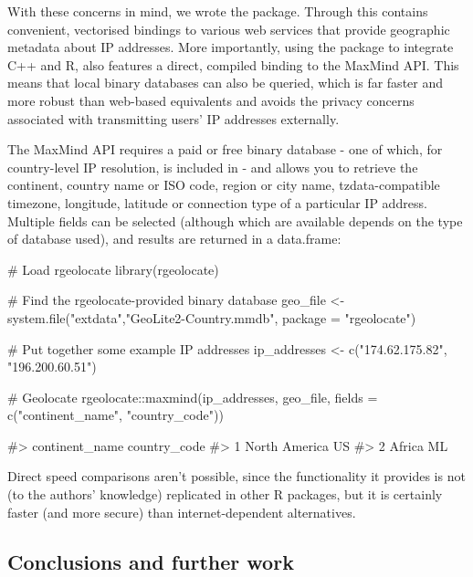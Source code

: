 With these concerns in mind, we wrote the 
\citep{rgeolocate} package. Through  this contains convenient,
vectorised bindings to various web services that provide geographic
metadata about IP addresses. More importantly, using the 
package to integrate C++ and R,  also features a direct,
compiled binding to the MaxMind API. This means that local binary
databases can also be queried, which is far faster and more robust than
web-based equivalents and avoids the privacy concerns associated with
transmitting users' IP addresses externally.

The MaxMind API requires a paid or free binary database - one of which,
for country-level IP resolution, is included in  - and
allows you to retrieve the continent, country name or ISO code, region
or city name, tzdata-compatible timezone, longitude, latitude or
connection type of a particular IP address. Multiple fields can be
selected (although which are available depends on the type of database
used), and results are returned in a data.frame:

\begin{Schunk}
\begin{Sinput}
# Load rgeolocate
library(rgeolocate)

# Find the rgeolocate-provided binary database
geo_file <- system.file("extdata","GeoLite2-Country.mmdb", package = "rgeolocate")

# Put together some example IP addresses
ip_addresses <- c("174.62.175.82", "196.200.60.51")

# Geolocate
rgeolocate::maxmind(ip_addresses, geo_file, fields = c("continent_name", "country_code"))
\end{Sinput}
\begin{Soutput}
#>   continent_name country_code
#> 1  North America           US
#> 2         Africa           ML
\end{Soutput}
\end{Schunk}

Direct speed comparisons aren't possible, since the functionality it
provides is not (to the authors' knowledge) replicated in other R
packages, but it is certainly faster (and more secure) than
internet-dependent alternatives.

\subsection{Conclusions and further
work}\label{conclusions-and-further-work}

